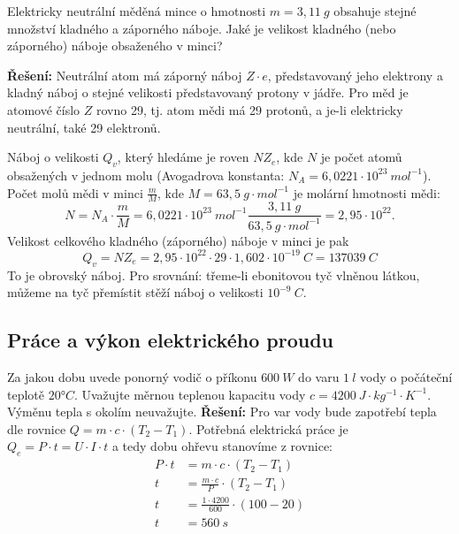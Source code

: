       \begin{example}
        Elektricky neutrální měděná mince o hmotnosti $ m = 3,11\ g$ obsahuje stejné množství
        kladného a záporného náboje. Jaké je velikost kladného (nebo záporného) náboje obsaženého v
        minci?
       
        \textbf{Řešení:}\newline
        Neutrální atom má záporný náboj $Z\cdot e$, představovaný jeho elektrony a kladný náboj o
        stejné velikosti představovaný protony v jádře. Pro měd je atomové číslo $Z$ rovno 29, tj.
        atom mědi má 29 protonů, a je-li elektricky neutrální, také 29 elektronů.
       
        Náboj o velikosti $Q_v$, který hledáme je roven $NZ_e$, kde $N$ je počet atomů obsažených v
        jednom molu (Avogadrova konstanta: $N_A = 6,0221\cdot10^{23}\ mol^{-1}$). Počet molů mědi v
        minci $\frac{m}{M}$, kde $M = 63,5\ g\cdot mol^{-1}$ je molární hmotnosti mědi:
        $$N = N_A\cdot\frac{m}{M} = 6,0221\cdot10^{23}\ mol^{-1}\frac{3,11\ g}{63,5\ g\cdot
        mol^{-1}} = 2,95\cdot10^{22}.$$ Velikost celkového kladného (záporného) náboje v minci je
        pak $$Q_v = NZ_e = 2,95\cdot10^{22}\cdot29\cdot1,602\cdot10^{-19}\ C = 137039\ C$$
        To je obrovský náboj. Pro srovnání: třeme-li ebonitovou tyč vlněnou látkou, můžeme na tyč
        přemístit stěží náboj o velikosti $10^{-9}\ C$.
      \end{example} 
 
    \subsection{Práce a výkon elektrického proudu}
      \begin{example}
        Za jakou dobu uvede ponorný vodič o příkonu $600\ W$ do varu $1\ l$ vody o počáteční
        teplotě $20°C$. Uvažujte měrnou teplenou kapacitu vody $c = 4200\ J\cdot kg^{-1}\cdot
        K^{-1}$. Výměnu tepla s okolím neuvažujte. \newline \textbf{Řešení:}\newline
        Pro var vody bude zapotřebí tepla dle rovnice $Q  = m\cdot c\cdot(T_2 - T_1)$. Potřebná
        elektrická práce je $Q_e = P\cdot t = U\cdot I\cdot t$ a tedy dobu ohřevu stanovíme z
        rovnice:
          \begin{align*}
            P\cdot t &= m\cdot c\cdot(T_2 - T_1)               \\
                   t &= \frac{m\cdot c}{P}\cdot(T_2 - T_1)     \\
                   t &= \frac{1\cdot 4200}{600}\cdot(100 - 20) \\
                   t &= 560\ s
          \end{align*}         
      \end{example}
 
